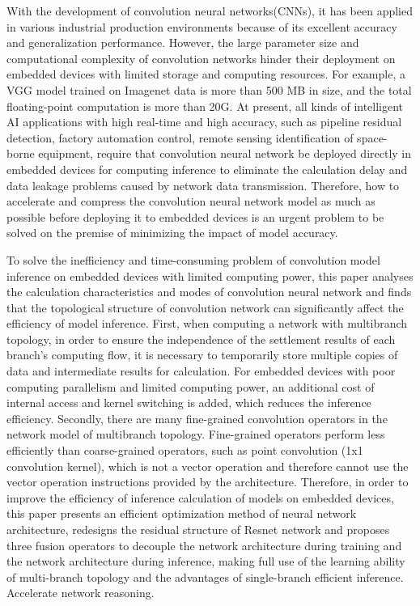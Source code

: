 \begin{abstract*}

With the development of convolution neural networks(CNNs), it has been applied in various industrial production environments because of its excellent accuracy and generalization performance. However, the large parameter size and computational complexity of convolution networks hinder their deployment on embedded devices with limited storage and computing resources. For example, a VGG model trained on Imagenet data is more than 500 MB in size, and the total floating-point computation is more than 20G. At present, all kinds of intelligent AI applications with high real-time and high accuracy, such as pipeline residual detection, factory automation control, remote sensing identification of space-borne equipment, require that convolution neural network be deployed directly in embedded devices for computing inference to eliminate the calculation delay and data leakage problems caused by network data transmission. Therefore, how to accelerate and compress the convolution neural network model as much as possible before deploying it to embedded devices is an urgent problem to be solved on the premise of minimizing the impact of model accuracy.

To solve the inefficiency and time-consuming problem of convolution model inference on embedded devices with limited computing power, this paper analyses the calculation characteristics and modes of convolution neural network and finds that the topological structure of convolution network can significantly affect the efficiency of model inference. First, when computing a network with multibranch topology, in order to ensure the independence of the settlement results of each branch's computing flow, it is necessary to temporarily store multiple copies of data and intermediate results for calculation. For embedded devices with poor computing parallelism and limited computing power, an additional cost of internal access and kernel switching is added, which reduces the inference efficiency. Secondly, there are many fine-grained convolution operators in the network model of multibranch topology. Fine-grained operators perform less efficiently than coarse-grained operators, such as point convolution (1x1 convolution kernel), which is not a vector operation and therefore cannot use the vector operation instructions provided by the architecture. Therefore, in order to improve the efficiency of inference calculation of models on embedded devices, this paper presents an efficient optimization method of neural network architecture, redesigns the residual structure of Resnet network and proposes three fusion operators to decouple the network architecture during training and the network architecture during inference, making full use of the learning ability of multi-branch topology and the advantages of single-branch efficient inference. Accelerate network reasoning.


\end{abstract*}
